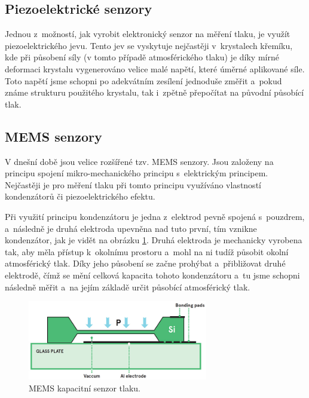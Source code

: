 \subsection{Piezoelektrické senzory}

Jednou z~možností, jak vyrobit elektronický senzor na měření tlaku, je využít piezoelektrického jevu. Tento jev se vyskytuje nejčastěji v~krystalech křemíku, kde při působení síly (v tomto případě atmosférického tlaku) je díky mírné deformaci krystalu vygenerováno velice malé napětí, které úměrné aplikované síle. Toto napětí jsme schopni po adekvátním zesílení jednoduše změřit a~pokud známe strukturu použitého krystalu, tak i~zpětně přepočítat na původní působící tlak.

\subsection{MEMS senzory}

V dnešní době jsou velice rozšířené tzv. MEMS senzory. Jsou založeny na principu spojení mikro-mechanického principu s~elektrickým principem. Nejčastěji je pro měření tlaku při tomto principu využíváno vlastností kondenzátorů či piezoelektrického efektu.

Při využití principu kondenzátoru je jedna z~elektrod pevně spojená s~pouzdrem, a~následně je druhá elektroda upevněna nad tuto první, tím vznikne kondenzátor, jak je vidět na obrázku \ref{fig_memsCapacitiveSensor}. Druhá elektroda je mechanicky vyrobena tak, aby měla přístup k~okolnímu prostoru a~mohl na ni tudíž působit okolní atmosférický tlak. Díky jeho působení se začne prohýbat a~přibližovat druhé elektrodě, čímž se mění celková kapacita tohoto kondenzátoru a~tu jsme schopni následně měřit a~na jejím základě určit působící atmosférický tlak.

\begin{figure}
    \includegraphics[width=0.7\textwidth]{obrazky/MEMS_capacitive_sensor.jpg}
    \caption{MEMS kapacitní senzor tlaku. \cite{AvnetMEMS}}
    \label{fig_memsCapacitiveSensor}
\end{figure}

